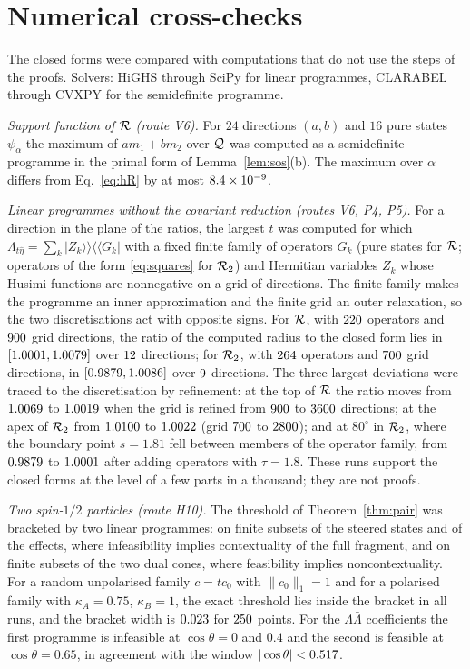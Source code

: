 \section{Numerical cross-checks}
\label{app:numerics}

The closed forms were compared with computations that do not use the steps of the proofs. Solvers: HiGHS \cite{highs} through SciPy \cite{scipy} for linear programmes, CLARABEL \cite{clarabel} through CVXPY \cite{cvxpy} for the semidefinite programme.

\emph{Support function of $\mathcal{R}$ (route V6).} For $24$ directions $(a,b)$ and $16$ pure states $\psi_\alpha$ the maximum of $am_1+bm_2$ over $\mathcal{Q}$ was computed as a semidefinite programme in the primal form of Lemma~\ref{lem:sos}(b). The maximum over $\alpha$ differs from Eq.~\eqref{eq:hR} by at most $8.4\times 10^{-9}$.

\emph{Linear programmes without the covariant reduction (routes V6, P4, P5).} For a direction in the plane of the ratios, the largest $t$ was computed for which $\Lambda_{t\hat\eta}=\sum_k|Z_k\rangle\!\rangle\langle\!\langle G_k|$ with a fixed finite family of operators $G_k$ (pure states for $\mathcal{R}$; operators of the form \eqref{eq:squares} for $\mathcal{R}_2$) and Hermitian variables $Z_k$ whose Husimi functions are nonnegative on a grid of directions. The finite family makes the programme an inner approximation and the finite grid an outer relaxation, so the two discretisations act with opposite signs. For $\mathcal{R}$, with $220$ operators and $900$ grid directions, the ratio of the computed radius to the closed form lies in $[1.0001,1.0079]$ over $12$ directions; for $\mathcal{R}_2$, with $264$ operators and $700$ grid directions, in $[0.9879,1.0086]$ over $9$ directions. The three largest deviations were traced to the discretisation by refinement: at the top of $\mathcal{R}$ the ratio moves from $1.0069$ to $1.0019$ when the grid is refined from $900$ to $3600$ directions; at the apex of $\mathcal{R}_2$ from $1.0100$ to $1.0022$ (grid $700$ to $2800$); and at $80^\circ$ in $\mathcal{R}_2$, where the boundary point $s=1.81$ fell between members of the operator family, from $0.9879$ to $1.0001$ after adding operators with $\tau=1.8$. These runs support the closed forms at the level of a few parts in a thousand; they are not proofs.

\emph{Two spin-$1/2$ particles (route H10).} The threshold of Theorem~\ref{thm:pair} was bracketed by two linear programmes: on finite subsets of the steered states and of the effects, where infeasibility implies contextuality of the full fragment, and on finite subsets of the two dual cones, where feasibility implies noncontextuality. For a random unpolarised family $c=tc_0$ with $\|c_0\|_1=1$ and for a polarised family with $\kappa_A=0.75$, $\kappa_B=1$, the exact threshold lies inside the bracket in all runs, and the bracket width is $0.023$ for $250$ points. For the $\Lambda\bar\Lambda$ coefficients the first programme is infeasible at $\cos\theta=0$ and $0.4$ and the second is feasible at $\cos\theta=0.65$, in agreement with the window $|\cos\theta|<0.517$.

